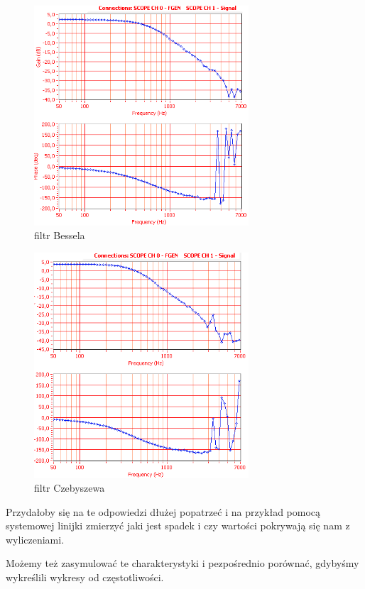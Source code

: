 \documentclass[a4paper,11pt]{article}
\begin{document}
\begin{figure}[H]
\begin{center}
\includegraphics[width=8cm]{obrazki/belzebub1bialy.png}
\end{center}
\caption{filtr Bessela}
\end{figure}

\begin{figure}[H]
\begin{center}
\includegraphics[width=8cm]{obrazki/trzebieszow1bialy.png}
\end{center}
\caption{filtr Czebyszewa}
\end{figure}


\begin{LARGE}
Przydałoby się na te odpowiedzi dłużej popatrzeć i na przykład
pomocą systemowej linijki zmierzyć jaki jest spadek i czy wartości
pokrywają się nam z wyliczeniami.

Możemy też zasymulować te charakterystyki i pezpośrednio porównać,
gdybyśmy wykreślili wykresy od częstotliwości.
\end{LARGE}
\end{document}
